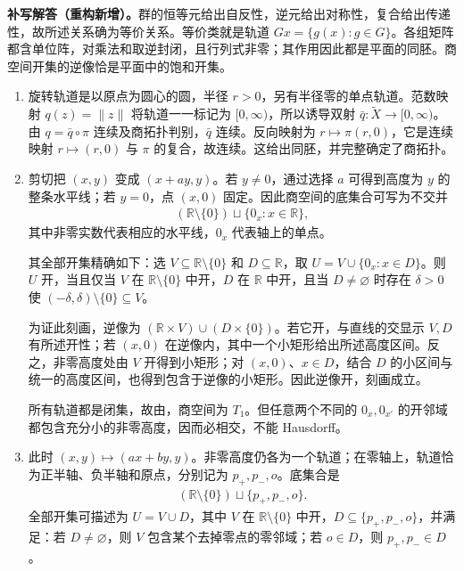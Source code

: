 \documentclass[../../main.tex]{subfiles}%
\begin{document}
\begin{solution}
\textbf{补写解答（重构新增）。}群的恒等元给出自反性，逆元给出对称性，复合给出传递性，故所述关系确为等价关系。等价类就是轨道 $Gx=\{g(x):g\in G\}$。各组矩阵都含单位阵，对乘法和取逆封闭，且行列式非零；其作用因此都是平面的同胚。商空间开集的逆像恰是平面中的饱和开集。
\begin{enumerate}
\item 旋转轨道是以原点为圆心的圆，半径 $r>0$，另有半径零的单点轨道。范数映射 $q(z)=\|z\|$ 将轨道一一标记为 $[0,\infty)$，所以诱导双射 $\bar q:\widetilde X\to[0,\infty)$。由 $q=\bar q\circ\pi$ 连续及商拓扑判别，$\bar q$ 连续。反向映射为 $r\mapsto\pi(r,0)$，它是连续映射 $r\mapsto(r,0)$ 与 $\pi$ 的复合，故连续。这给出同胚，并完整确定了商拓扑。

\item 剪切把 $(x,y)$ 变成 $(x+ay,y)$。若 $y\ne0$，通过选择 $a$ 可得到高度为 $y$ 的整条水平线；若 $y=0$，点 $(x,0)$ 固定。因此商空间的底集合可写为不交并
\begin{align*}
(\mathbb R\setminus\{0\})\sqcup\{0_x:x\in\mathbb R\},
\end{align*}
其中非零实数代表相应的水平线，$0_x$ 代表轴上的单点。

其全部开集精确如下：选 $V\subseteq\mathbb R\setminus\{0\}$ 和 $D\subseteq\mathbb R$，取 $U=V\cup\{0_x:x\in D\}$。则 $U$ 开，当且仅当 $V$ 在 $\mathbb R\setminus\{0\}$ 中开，$D$ 在 $\mathbb R$ 中开，且当 $D\ne\varnothing$ 时存在 $\delta>0$ 使 $(-\delta,\delta)\setminus\{0\}\subseteq V$。

为证此刻画，逆像为 $(\mathbb R\times V)\cup(D\times\{0\})$。若它开，与直线的交显示 $V,D$ 有所述开性；若 $(x,0)$ 在逆像内，其中一个小矩形给出所述高度区间。反之，非零高度处由 $V$ 开得到小矩形；对 $(x,0)$、$x\in D$，结合 $D$ 的小区间与统一的高度区间，也得到包含于逆像的小矩形。因此逆像开，刻画成立。

所有轨道都是闭集，故由，商空间为 $T_1$。但任意两个不同的 $0_x,0_{x'}$ 的开邻域都包含充分小的非零高度，因而必相交，不能 Hausdorff。

\item 此时 $(x,y)\mapsto(ax+by,y)$。非零高度仍各为一个轨道；在零轴上，轨道恰为正半轴、负半轴和原点，分别记为 $p_+,p_-,o$。底集合是
\begin{align*}
(\mathbb R\setminus\{0\})\sqcup\{p_+,p_-,o\}.
\end{align*}
全部开集可描述为 $U=V\cup D$，其中 $V$ 在 $\mathbb R\setminus\{0\}$ 中开，$D\subseteq\{p_+,p_-,o\}$，并满足：若 $D\ne\varnothing$，则 $V$ 包含某个去掉零点的零邻域；若 $o\in D$，则 $p_+,p_-\in D$。


\end{enumerate}
\end{solution}
\end{document}
